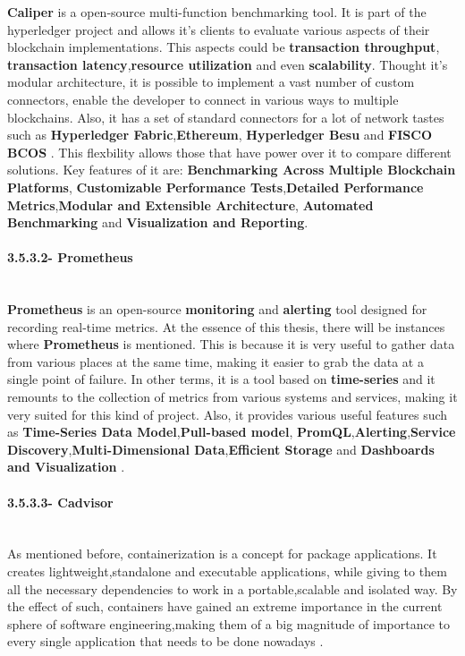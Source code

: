 \textbf{Caliper} \cite{HyperledgerCaliper} is a open-source multi-function benchmarking tool. It is part of the hyperledger project and 
allows it's clients to evaluate various aspects of their blockchain implementations. This aspects could be \textbf{transaction throughput},
\textbf{transaction latency},\textbf{resource utilization} and even \textbf{scalability}. Thought it's modular architecture, it 
is possible to implement a vast number of custom connectors, enable the developer to connect in various ways to multiple blockchains. Also, it has a 
set of standard connectors for a lot of network tastes such as \textbf{Hyperledger Fabric},\textbf{Ethereum},
\textbf{Hyperledger Besu} \cite{HyperledgerBesu} and \textbf{FISCO BCOS} \cite{FISCOBCOS}. This flexbility allows those that have power 
over it to compare different solutions. Key features of it are: \textbf{Benchmarking Across Multiple Blockchain Platforms},
\textbf{Customizable Performance Tests},\textbf{Detailed Performance Metrics},\textbf{Modular and Extensible Architecture},
\textbf{Automated Benchmarking} and \textbf{Visualization and Reporting}.

\paragraph{3.5.3.2- Prometheus}\mbox{}\\
\textbf{Prometheus} is an open-source \textbf{monitoring} and \textbf{alerting} tool designed for recording real-time metrics. At the 
essence of this thesis, there will be instances where \textbf{Prometheus} is mentioned. This is because it is very useful to gather 
data from various places at the same time, making it easier to grab the data at a single point of failure. In other terms, it is a tool 
based on \textbf{time-series} and it remounts to the collection of metrics from various systems and services, making it very suited for 
this kind of project. Also, it provides various useful features such as \textbf{Time-Series Data Model},\textbf{Pull-based model},
\textbf{PromQL},\textbf{Alerting},\textbf{Service Discovery},\textbf{Multi-Dimensional Data},\textbf{Efficient Storage} and 
\textbf{Dashboards and Visualization} \cite{prometheus}.


\paragraph{3.5.3.3- Cadvisor}\mbox{}\\

As mentioned before, containerization is a concept for package applications. It creates lightweight,standalone  and executable applications, 
while giving to them all the necessary dependencies to work in a portable,scalable and isolated way. By the effect of such, containers 
have gained an extreme importance in the current sphere of software engineering,making them of a big magnitude of importance to every single 
application that needs to be done nowadays \cite{cadvisor}.


